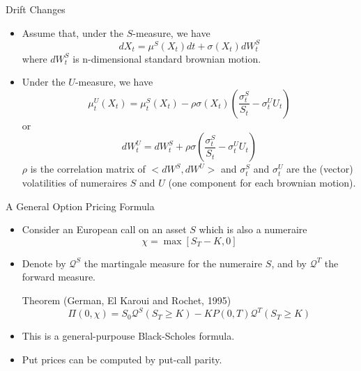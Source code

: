 \documentclass{beamer}
\begin{document}
\begin{frame}{Drift Changes}
\begin{itemize}
\item Assume that, under the $S$-measure, we have
\begin{equation}
dX_t = \mu^S(X_t)dt + \sigma(X_t)dW^S_t
\end{equation}
where $dW^S_t$ is n-dimensional standard brownian motion.
\item Under the $U$-measure, we have
\begin{equation}
\mu^U_t(X_t) = \mu^S_t(X_t) - \rho\sigma(X_t)\left(\frac{\sigma^S_t}{S_t}-{\sigma^U_t}{U_t}\right) 
\end{equation}
or
\begin{equation}
dW^U_t = dW^S_t + \rho\sigma\left(\frac{\sigma^S_t}{S_t}-{\sigma^U_t}{U_t}\right) 
\end{equation}
$\rho$ is the correlation matrix of $<dW^S,dW^U>$ and $\sigma^S_t$ and $\sigma^U_t$ are the (vector) volatilities of numeraires $S$ and $U$ (one component for each brownian motion).
\end{itemize}
\end{frame}



\begin{frame}{A General Option Pricing Formula}
\begin{itemize}
	\item Consider an European call on an asset $S$ which is also a numeraire
	\begin{equation}
		\chi = \max[S_T-K,0]
	\end{equation}
\item Denote by $\mathcal{Q}^S$ the martingale measure for the numeraire $S$, and by $\mathcal{Q}^T$ the forward measure.
\begin{block}{Theorem (German, El Karoui and Rochet, 1995)}
	\begin{equation}
\Pi(0,\chi) = S_0\mathcal{Q}^S(S_T \geq K) - KP(0,T)\mathcal{Q}^T(S_T\geq K)
\end{equation}
\end{block}
\item This is a general-purpouse Black-Scholes formula.
\item Put prices can be computed by put-call parity.
\end{itemize}
\end{frame}
\end{document}
